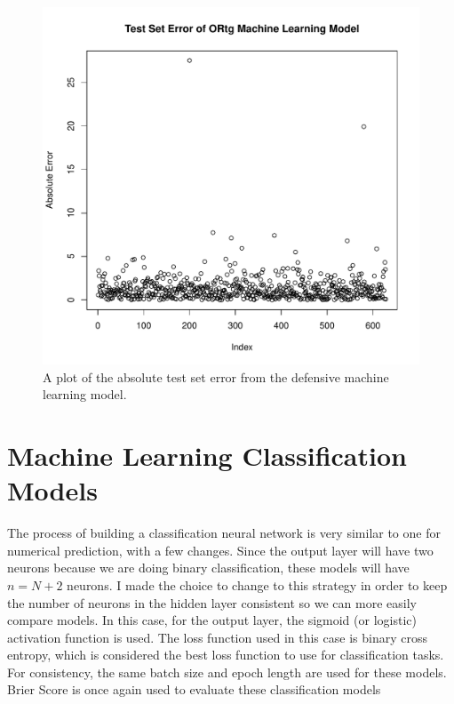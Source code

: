 \documentclass[12pt]{article}
\begin{document}
\begin{figure}[tbp]
	\centering
	\includegraphics[width=\textwidth]{dmlnp.test.error}
	\caption{A plot of the absolute test set error from the defensive machine learning model.}
	\label{fig:dmlnp.test.error}
\end{figure}

\begin{table}[t]
\centering
{}
\caption{Defensive Neural Network Model Evaluators}
\label{tab:dmlnp-results}
\end{table}

\section{Machine Learning Classification Models}
\label{sec:mlc}
The process of building a classification neural network is very similar to one for numerical prediction, with a few changes. Since the output layer will have two neurons because we are doing binary classification, these models will have \(n=N+2\) neurons. I made the choice to change to this strategy in order to keep the number of neurons in the hidden layer consistent so we can more easily compare models. In this case, for the output layer, the sigmoid (or logistic) activation function is used. The loss function used in this case is binary cross entropy, which is considered the best loss function to use for classification tasks. For consistency, the same batch size and epoch length are used for these models. Brier Score is once again used to evaluate these classification models
\end{document}
